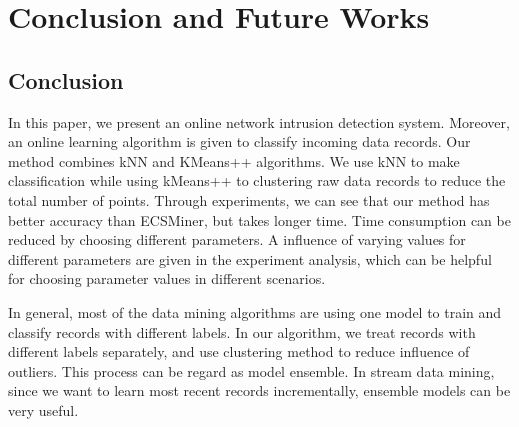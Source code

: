 \documentclass[runningheads]{llncs}
\begin{document}
	\section{Conclusion and Future Works} \label{conclusion}
	
	\subsection{Conclusion}
	In this paper, we present an online network intrusion detection system. Moreover, an online learning algorithm is given to classify incoming data records. Our method combines kNN and KMeans++ algorithms. We use kNN to make classification while using kMeans++ to clustering raw data records to reduce the total number of points. Through experiments, we can see that our method has better accuracy than ECSMiner, but takes longer time. Time consumption can be reduced by choosing different parameters. A influence of varying values for different parameters are given in the experiment analysis, which can be helpful for choosing parameter values in different scenarios.
	
	In general, most of the data mining algorithms are using one model to train and classify records with different labels. In our algorithm, we treat records with different labels separately, and use clustering method to reduce influence of outliers. This process can be regard as model ensemble. In stream data mining, since we want to learn most recent records incrementally, ensemble models can be very useful.
	
\end{document}
